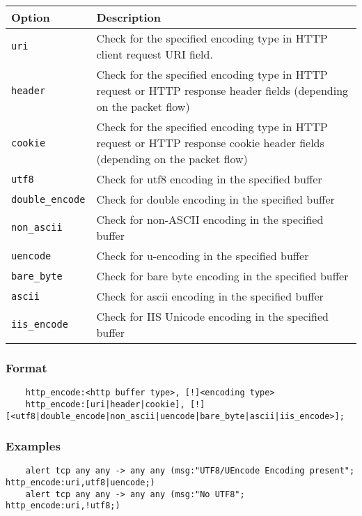 \documentclass[english]{report}
\begin{document}
\begin{tabular}{| l | p{4.5in} |}
\hline
{\bf Option} & {\bf Description}\\
\hline
\hline
\texttt{uri} & Check for the specified encoding type in HTTP client request URI field.\\
\hline
\texttt{header} & Check for the specified encoding type in HTTP request or HTTP response header fields
(depending on the packet flow)\\
\hline
\texttt{cookie} & Check for the specified encoding type in HTTP request or HTTP response cookie 
header fields (depending on the packet flow)\\
\hline
\texttt{utf8} & Check for utf8 encoding in the specified buffer\\
\hline
\texttt{double\_encode} & Check for double encoding in the specified buffer\\
\hline
\texttt{non\_ascii} & Check for non-ASCII encoding in the specified buffer\\
\hline
\texttt{uencode} & Check for u-encoding in the specified buffer\\
\hline
\texttt{bare\_byte} & Check for bare byte encoding in the specified buffer\\
\hline
\texttt{ascii} & Check for ascii encoding in the specified buffer\\
\hline
\texttt{iis\_encode} & Check for IIS Unicode encoding in the specified buffer\\
\hline
\end{tabular}

\subsubsection{Format}

\begin{verbatim}
    http_encode:<http buffer type>, [!]<encoding type>
    http_encode:[uri|header|cookie], [!][<utf8|double_encode|non_ascii|uencode|bare_byte|ascii|iis_encode>];
\end{verbatim}

\subsubsection{Examples}
\begin{verbatim}
    alert tcp any any -> any any (msg:"UTF8/UEncode Encoding present"; http_encode:uri,utf8|uencode;)
    alert tcp any any -> any any (msg:"No UTF8"; http_encode:uri,!utf8;)
\end{verbatim}
\end{document}
